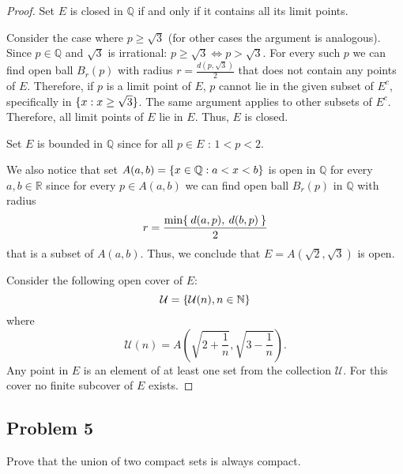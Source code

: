 \documentclass{article}
\newcommand{\R}{\mathbb{R}}
\newcommand{\N}{\mathbb{N}}
\newcommand{\Q}{\mathbb{Q}}
\DeclarePairedDelimiter{\set}{ \{ }{ \} }
\begin{document}
\begin{proof}

Set $E$ is closed in $\Q$ if and only if it contains all its limit points. 

Consider the case where $p \geq \sqrt{3}$ (for other cases the argument is analogous).
Since $p \in \Q$ and $\sqrt{3}$ is irrational: $p \geq \sqrt{3} \iff p > \sqrt{3}$.
For every such $p$ we can find open ball $B_r(p)$ with radius $r = \frac{d(p,\sqrt{3})}{2}$ that does not contain any points of $E$. 
Therefore, if $p$ is a limit point of $E$, $p$ cannot lie in the given subset of $E^c$, specifically in $\set{x : x \geq \sqrt{3} }$.
The same argument applies to other subsets of $E^c$.
Therefore, all limit points of $E$ lie in $E$. Thus, $E$ is closed.

Set $E$ is bounded in $\Q$ since for all $p \in E$ : $1 < p < 2$.

We also notice that set $A(a,b) = \set{x \in \Q : a < x < b }$ is open in $\Q$ for every $a,b \in \R$ since for every $p \in A(a,b)$ we can find open ball $B_r(p)$ in $\Q$ with radius
\[ r = \frac{\min\set{ \> d(a, p), \> d(b, p) \> }}{2} \]
that is a subset of $A(a,b)$.
Thus, we conclude that $E = A(\sqrt{2}, \sqrt{3})$ is open.

Consider the following open cover of $E$:
\[ \mathcal{U} = \set*{ \mathcal{U}(n) , n \in \N } \]
where
\[ \mathcal{U}(n) = A \left( \sqrt{2+\frac{1}{n}}, \sqrt{3 - \frac{1}{n}} \right). \]
Any point in $E$ is an element of at least one set from the collection $\mathcal{U}$.
For this cover no finite subcover of $E$ exists.

\end{proof}


\subsection*{Problem 5}

\begin{tcolorbox}
Prove that the union of two compact sets is always compact. 
\end{tcolorbox}
\end{document}
